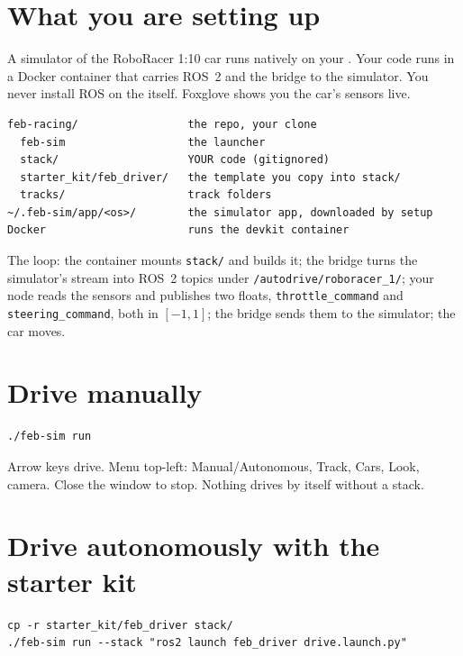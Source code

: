 
\section*{What you are setting up}

A simulator of the RoboRacer 1:10 car runs natively on your \OSname. Your code runs in a Docker
container that carries ROS~2 and the bridge to the simulator. You never install ROS on the
\OSname{} itself. Foxglove shows you the car's sensors live.

\begin{lstlisting}
feb-racing/                 the repo, your clone
  feb-sim                   the launcher
  stack/                    YOUR code (gitignored)
  starter_kit/feb_driver/   the template you copy into stack/
  tracks/                   track folders
~/.feb-sim/app/<os>/        the simulator app, downloaded by setup
Docker                      runs the devkit container
\end{lstlisting}

The loop: the container mounts \texttt{stack/} and builds it; the bridge turns the simulator's
stream into ROS~2 topics under \texttt{/autodrive/roboracer\_1/}; your node reads the sensors
and publishes two floats, \texttt{throttle\_command} and \texttt{steering\_command}, both in
$[-1, 1]$; the bridge sends them to the simulator; the car moves.



\section{Drive manually}

\begin{lstlisting}
./feb-sim run
\end{lstlisting}

Arrow keys drive. Menu top-left: Manual/Autonomous, Track, Cars, Look, camera. Close the
window to stop. Nothing drives by itself without a stack.

\section{Drive autonomously with the starter kit}

\begin{lstlisting}
cp -r starter_kit/feb_driver stack/
./feb-sim run --stack "ros2 launch feb_driver drive.launch.py"
\end{lstlisting}

